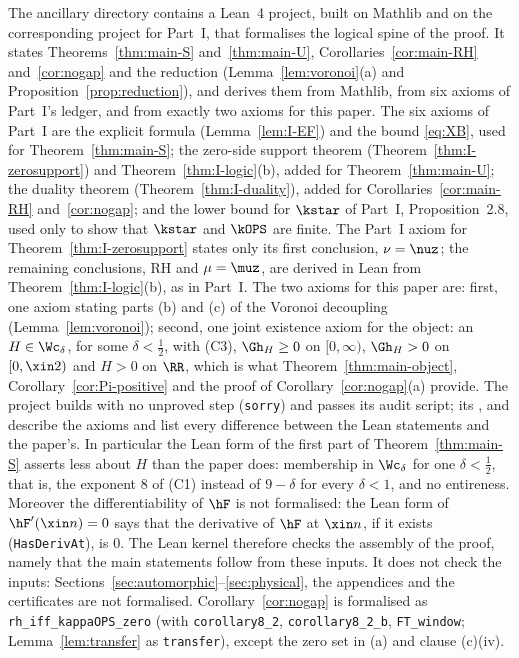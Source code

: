 The ancillary directory  contains a Lean~4 project, built on Mathlib and on the corresponding project for Part~I, that formalises
the logical spine of the proof. It states Theorems~\ref{thm:main-S} and~\ref{thm:main-U}, Corollaries~\ref{cor:main-RH} and~\ref{cor:nogap} and the reduction
(Lemma~\ref{lem:voronoi}(a) and Proposition~\ref{prop:reduction}), and derives them from Mathlib, from six axioms of Part~I's ledger, and from
exactly two axioms for this paper. The six axioms of Part~I are the explicit formula (Lemma~\ref{lem:I-EF}) and the bound \eqref{eq:XB}, used for
Theorem~\ref{thm:main-S}; the zero-side support theorem (Theorem~\ref{thm:I-zerosupport}) and Theorem~\ref{thm:I-logic}(b), added for
Theorem~\ref{thm:main-U}; the duality theorem (Theorem~\ref{thm:I-duality}), added for Corollaries~\ref{cor:main-RH} and~\ref{cor:nogap}; and the lower bound for
$\kstar$ of Part~I, Proposition~2.8, used only to show that $\kstar$ and $\kOPS$ are finite. The Part~I axiom for
Theorem~\ref{thm:I-zerosupport} states only its first conclusion, $\nu=\nuz$; the remaining conclusions, RH and $\mu=\muz$, are derived in Lean
from Theorem~\ref{thm:I-logic}(b), as in Part~I. The two axioms for this paper are: first, one axiom stating
parts (b) and (c) of the Voronoi decoupling (Lemma~\ref{lem:voronoi}); second, one joint existence axiom for the object: an $H\in\Wc_\delta$, for
some $\delta<\frac12$, with (C3), $\Gh_H\ge0$ on $[0,\infty)$, $\Gh_H>0$ on $[0,\xin2)$ and $H>0$ on $\RR$, which is what
Theorem~\ref{thm:main-object}, Corollary~\ref{cor:Pi-positive} and the proof of Corollary~\ref{cor:nogap}(a) provide. The
project builds with no unproved step (\texttt{sorry}) and passes its audit script; its ,  and 
describe the axioms and list every difference between the Lean statements and the paper's. In particular the Lean form of the
first part of Theorem~\ref{thm:main-S} asserts less about $H$ than the paper does: membership in $\Wc_\delta$ for one $\delta<\frac12$, that is, the
exponent $8$ of (C1) instead of $9-\delta$ for every $\delta<1$, and no entireness. Moreover the differentiability of $\hF$ is not formalised:
the Lean form of $\hF'(\xin n)=0$ says that the derivative of $\hF$ at $\xin n$, if it exists (\texttt{HasDerivAt}), is $0$. The Lean kernel
therefore checks the assembly of the proof, namely that the main statements follow from these inputs. It
does not check the inputs: Sections~\ref{sec:automorphic}--\ref{sec:physical}, the appendices and the certificates are not formalised.
Corollary~\ref{cor:nogap} is formalised as \texttt{rh\_iff\_kappaOPS\_zero} (with \texttt{corollary8\_2}, \texttt{corollary8\_2\_b},
\texttt{FT\_window}; Lemma~\ref{lem:transfer} as \texttt{transfer}), except the zero set in (a) and clause (c)(iv).
